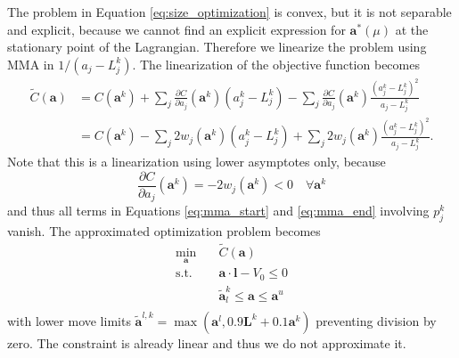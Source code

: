 The problem in Equation \eqref{eq:size_optimization} is convex, but it is not separable and explicit, because we cannot find an explicit expression for $\mathbf{a}^*(\mu)$ at the stationary point of the Lagrangian. Therefore we linearize the problem using MMA in $1/(a_j-L_j^k)$. The linearization of the objective function becomes
\begin{align}
    \tilde{C}(\mathbf{a}) &= C(\mathbf{a}^k) + \sum_j \frac{\partial C}{\partial a_j}(\mathbf{a}^k) (a^k_j-L^k_j) - \sum_j \frac{\partial C}{\partial a_j}(\mathbf{a}^k) \frac{(a^k_j-L^k_j)^2}{a_j-L^k_j}\\
    &=C(\mathbf{a}^k) 
    - \sum_j 2w_j (\mathbf{a}^k) (a^k_j-L^k_j)
    + \sum_j 2w_j (\mathbf{a}^k)
    \frac{(a^k_j-L^k_j)^2}{a_j-L^k_j}.
\end{align}
Note that this is a linearization using lower asymptotes only, because 
\begin{equation}
    \frac{\partial C }{\partial a_j}(\mathbf{a}^k)  = - 2 w_j (\mathbf{a}^k) < 0 \quad \forall \mathbf{a}^k
\end{equation} 
and thus all terms in Equations \eqref{eq:mma_start} and \eqref{eq:mma_end} involving $p_j^k$ vanish.
The approximated optimization problem becomes 
\begin{equation}
    \begin{aligned}
        \min_{\mathbf{a}} \quad & \tilde{C} (\mathbf{a})\\
        \textrm{s.t.} \quad & \mathbf{a} \cdot \mathbf{l} - V_0 \le 0  \\
                            & \tilde{\mathbf{a}}^k_l \le \mathbf{a} \le \mathbf{a}^u\\
    \end{aligned}
\end{equation}
with lower move limits $\tilde{\mathbf{a}}^{l,k} = \max(\mathbf{a}^l,  0.9 \mathbf{L}^k + 0.1 \mathbf{a}^k)$ preventing division by zero. The constraint is already linear and thus we do not approximate it.

